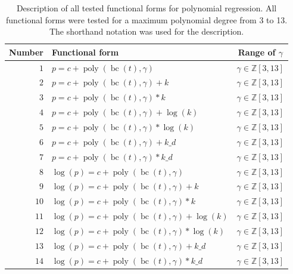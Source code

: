 \documentclass[12pt,a4paper]{article}
\DeclareMathOperator{\bc}{bc}
\DeclareMathOperator{\poly}{poly}
\begin{document}
\begin{table}
    \centering
    \caption{Description of all tested functional forms for polynomial regression. All functional forms were tested for a maximum polynomial degree from 3 to 13. The shorthand notation was used for the description.}
    \label{tab:func_form}    
    \begin{tabular}{rlc}
        Number & Functional form & Range of $\gamma$ \\
        \toprule
        $1$ & $p = c + \poly\left( \bc(t), \gamma \right) $ & $\gamma \in \mathbb{Z} \left[3, 13 \right]$\\ 
        $2$ & $p = c + \poly\left( \bc(t), \gamma \right) + k $ & $\gamma \in \mathbb{Z} \left[3, 13 \right]$\\
        $3$ & $p = c + \poly\left( \bc(t), \gamma \right) * k $ & $\gamma \in \mathbb{Z} \left[3, 13 \right]$\\
        $4$ & $p = c + \poly\left( \bc(t), \gamma \right) + \log(k) $ & $\gamma \in \mathbb{Z} \left[3, 13 \right]$\\
        $5$ & $p = c + \poly\left( \bc(t), \gamma \right) * \log(k) $ & $\gamma \in \mathbb{Z} \left[3, 13 \right]$\\
        $6$ & $p = c + \poly\left( \bc(t), \gamma \right) + k\_d $ & $\gamma \in \mathbb{Z} \left[3, 13 \right]$\\
        $7$ & $p = c + \poly\left( \bc(t), \gamma \right) * k\_d $ & $\gamma \in \mathbb{Z} \left[3, 13 \right]$\\ %
        \midrule
        $8$ & $\log(p) = c + \poly\left( \bc(t), \gamma \right) $ & $\gamma \in \mathbb{Z} \left[3, 13 \right]$\\ 
        $9$ & $\log(p) = c + \poly\left( \bc(t), \gamma \right) + k $ & $\gamma \in \mathbb{Z} \left[3, 13 \right]$\\
        $10$ & $\log(p) = c + \poly\left( \bc(t), \gamma \right) * k $ & $\gamma \in \mathbb{Z} \left[3, 13 \right]$\\
        $11$ & $\log(p) = c + \poly\left( \bc(t), \gamma \right) + \log(k) $ & $\gamma \in \mathbb{Z} \left[3, 13 \right]$\\
        $12$ & $\log(p) = c + \poly\left( \bc(t), \gamma \right) * \log(k) $ & $\gamma \in \mathbb{Z} \left[3, 13 \right]$\\
        $13$ & $\log(p) = c + \poly\left( \bc(t), \gamma \right) + k\_d $ & $\gamma \in \mathbb{Z} \left[3, 13 \right]$\\
        $14$ & $\log(p) = c + \poly\left( \bc(t), \gamma \right) * k\_d $ & $\gamma \in \mathbb{Z} \left[3, 13 \right]$\\   

\end{tabular}
\end{table}
\end{document}
